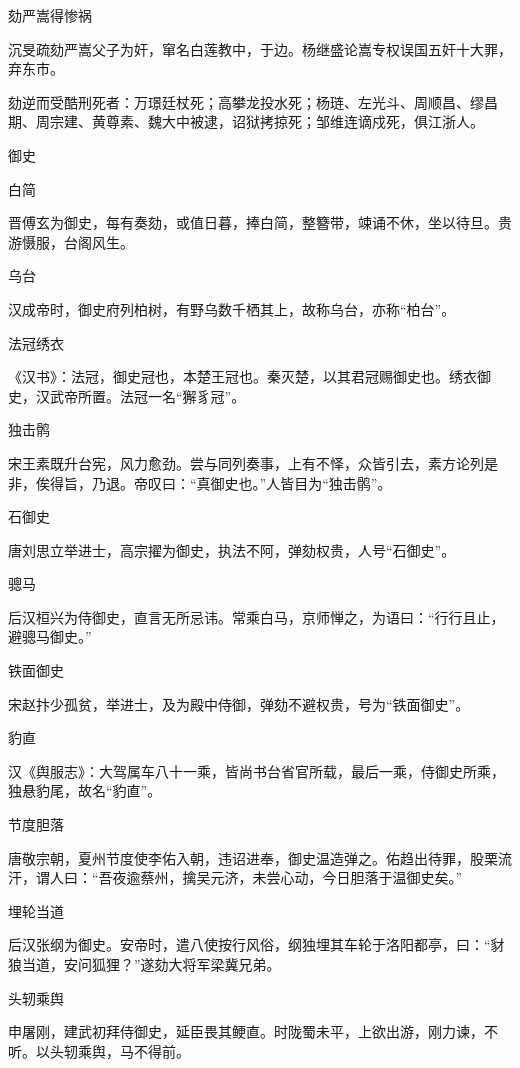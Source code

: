 \documentclass[a4paper,12pt,UTF8,twoside]{ctexbook}
\begin{document}
    劾严嵩得惨祸
    
    沉旻疏劾严嵩父子为奸，窜名白莲教中，于边。杨继盛论嵩专权误国五奸十大罪，弃东市。
    
    劾逆而受酷刑死者：万璟廷杖死；高攀龙投水死；杨琏、左光斗、周顺昌、缪昌期、周宗建、黄尊素、魏大中被逮，诏狱拷掠死；邹维连谪戍死，俱江浙人。
    
    御史
    
    白简
    
    晋傅玄为御史，每有奏劾，或值日暮，捧白简，整簪带，竦诵不休，坐以待旦。贵游慑服，台阁风生。
    
    乌台
    
    汉成帝时，御史府列柏树，有野乌数千栖其上，故称乌台，亦称“柏台”。
    
    法冠绣衣
    
    《汉书》：法冠，御史冠也，本楚王冠也。秦灭楚，以其君冠赐御史也。绣衣御史，汉武帝所置。法冠一名“獬豸冠”。
    
    独击鹘
    
    宋王素既升台宪，风力愈劲。尝与同列奏事，上有不怿，众皆引去，素方论列是非，俟得旨，乃退。帝叹曰：“真御史也。”人皆目为“独击鹘”。
    
    石御史
    
    唐刘思立举进士，高宗擢为御史，执法不阿，弹劾权贵，人号“石御史”。
    
    骢马
    
    后汉桓兴为侍御史，直言无所忌讳。常乘白马，京师惮之，为语曰：“行行且止，避骢马御史。”
    
    铁面御史
    
    宋赵抃少孤贫，举进士，及为殿中侍御，弹劾不避权贵，号为“铁面御史”。
    
    豹直
    
    汉《舆服志》：大驾属车八十一乘，皆尚书台省官所载，最后一乘，侍御史所乘，独悬豹尾，故名“豹直”。
    
    节度胆落
    
    唐敬宗朝，夏州节度使李佑入朝，违诏进奉，御史温造弹之。佑趋出待罪，股栗流汗，谓人曰：“吾夜逾蔡州，擒吴元济，未尝心动，今日胆落于温御史矣。”
    
    埋轮当道
    
    后汉张纲为御史。安帝时，遣八使按行风俗，纲独埋其车轮于洛阳都亭，曰：“豺狼当道，安问狐狸？”遂劾大将军梁冀兄弟。
    
    头轫乘舆
    
    申屠刚，建武初拜侍御史，延臣畏其鲠直。时陇蜀未平，上欲出游，刚力谏，不听。以头轫乘舆，马不得前。
    
\end{document}
